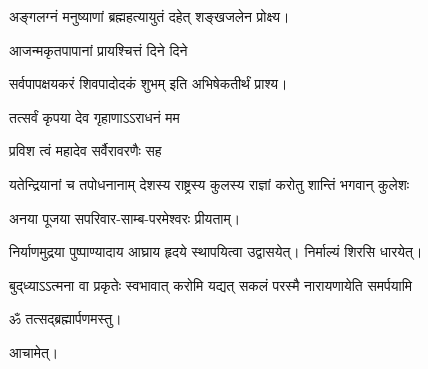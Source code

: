 \begin{center}
{अङ्गलग्नं मनुष्याणां ब्रह्महत्यायुतं दहेत्}
शङ्खजलेन प्रोक्ष्य।

{आजन्मकृतपापानां प्रायश्चित्तं दिने दिने}

{सर्वपापक्षयकरं शिवपादोदकं शुभम्}
इति अभिषेकतीर्थं प्राश्य।

{तत्सर्वं कृपया देव गृहाणाऽऽराधनं मम}

{प्रविश त्वं महादेव सर्वैरावरणैः सह}

{यतेन्द्रियानां च तपोधनानाम्}
{देशस्य राष्ट्रस्य कुलस्य राज्ञां}
{करोतु शान्तिं भगवान् कुलेशः}

अनया पूजया सपरिवार-साम्ब-परमेश्वरः प्रीयताम्।


निर्याणमुद्रया पुष्पाण्यादाय आघ्राय हृदये स्थापयित्वा उद्वासयेत्। निर्माल्यं शिरसि धारयेत्।

{बुद्‌ध्याऽऽत्मना वा प्रकृतेः स्वभावात्}
{करोमि यद्यत् सकलं परस्मै}
{नारायणायेति समर्पयामि}

ॐ तत्सद्ब्रह्मार्पणमस्तु।\medskip

आचामेत्।

\end{center}
\closesection
\clearpage